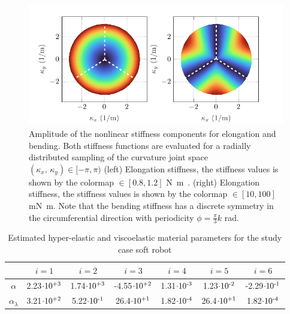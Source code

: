 \pgfplotsset{colormap name=turbo}
\begin{figure}[!t]
  \vspace{-5mm}
  \centering
  \includegraphics*{./pdf/thesis-figure-4-9.pdf}
  \vspace{-0.25cm}
  \caption{\small Amplitude of the nonlinear stiffness components for elongation and bending. Both stiffness functions are evaluated for a radially distributed sampling of the curvature joint space $(\kappa_x,\,\kappa_y) \in [-\pi,\pi)$ (left) Elongation stiffness, the stiffness values is shown by the colormap \protect{}$\!\!\in [0.8,1.2]$ \si{\newton \meter \inv}. (right) Elongation stiffness, the stiffness values is shown by the colormap \protect{}$\!\!\in [10,100]$ \si{\milli \newton  \meter}. Note that the bending stiffness has a discrete symmetry in the circumferential direction with periodicity $\phi = \tfrac{\pi}{3}k$ rad.}
  \vspace{-0.1cm}
  \label{fig:C2:stiffness_model}
\end{figure}

\begin{table}[!t]
  \caption{Estimated hyper-elastic and viscoelastic material parameters for the study case soft robot \label{tab:C2:elastic_parameters}}
  \centering
  \begin{tabular}{ccccccc}
  \hline
  & $i=1$ &  $i=2$ &  $i=3$ & $i=4$ &  $i=5$ & $i=6$ \\
  \hline
  \hline
  $\alpha$ &  \small{2.23}$\cdot10^{\textrm{+3}}$  & \small{1.74}$\cdot10^{\textrm{+3}}$  &  \small{-4.55}$\cdot10^{\textrm{+2}}$ & \small{1.31}$\cdot10^{\textrm{-3}}$  & \small{1.23}$\cdot10^{\textrm{-2}}$ & \small{-2.29}$\cdot10^{\textrm{-1}}$ \\[0.15em]
   $\alpha_\lambda$ &  \small{3.21}$\cdot10^{\textrm{+2}}$ & \small{5.22}$\cdot10^{\textrm{-1}}$ &  \small{26.4}$\cdot10^{\textrm{+1}}$& \small{1.82}$\cdot10^{\textrm{-4}}$ & \small{26.4}$\cdot10^{\textrm{+1}}$ & \small{1.82}$\cdot10^{\textrm{-4}}$ \\
  \hline
  \end{tabular}
  \vspace{-3mm}
  \end{table}

